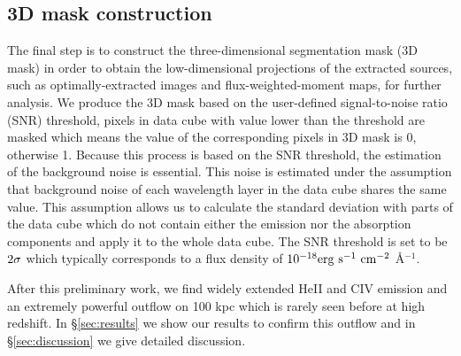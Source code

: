 \documentclass[../main.tex]{subfiles}
\begin{document}
\subsection{3D mask construction}
The final step is to construct the three-dimensional segmentation mask (3D mask) in order to obtain the low-dimensional projections of the extracted sources, such as optimally-extracted images and flux-weighted-moment maps, for further analysis. We produce the 3D mask based on the user-defined signal-to-noise ratio (SNR) threshold, pixels in data cube with value lower than the threshold are masked which means the value of the corresponding pixels in 3D mask is 0, otherwise 1.  Because this process is based on the SNR threshold, the estimation of the background noise is essential. This noise is estimated under the assumption that background noise of each wavelength layer in the data cube shares the same value. This assumption allows us to calculate the standard deviation with parts of the data cube which do not contain either the emission nor the absorption components and apply it to the whole data cube. The SNR threshold is set to be $\rm 2\sigma$ which typically corresponds to a flux density of $\rm 10^{-18} erg \ s^{-1} \ cm^{-2}$ \AA$^{-1}$.
 
 After this preliminary work, we find widely extended HeII and CIV emission and an extremely powerful outflow on 100 kpc which is rarely seen before at high redshift. In \S \ref{sec:results} we show our results to confirm this outflow and in \S \ref{sec:discussion} we give detailed discussion.
\end{document}
